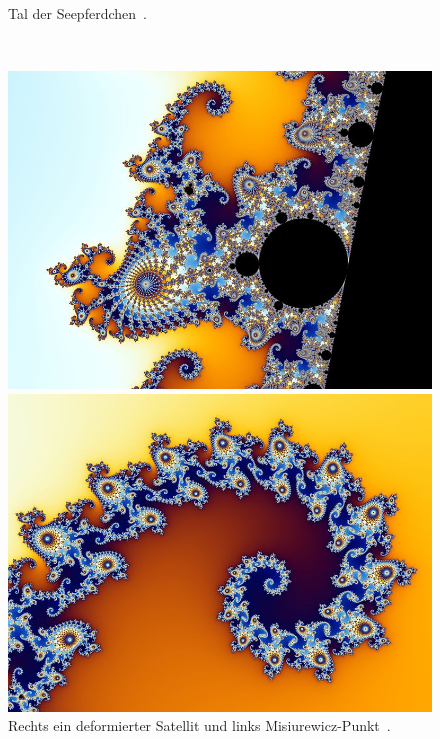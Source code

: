 \begin{figure}[H]
\begin{minipage}[t]{0.40\textwidth}
    \vspace*{-4ex}
    \caption{\grqq Tal der Seepferdchen\glqq~\cite{beyer_partial_2005-1}.}
    \label{app:6.2}
  \end{minipage}
  \\[2ex]
  \begin{minipage}[t]{0.40\textwidth}
    \centering
    \includegraphics[width=\linewidth]{images/zoom/800px-Mandel_zoom_03_seehorse}
    \vspace*{-4ex}
    \caption{Rechts ein deformierter Satellit und links Misiurewicz-Punkt~\cite{beyer_partial_2005-2}.}
    \label{app:6.3}
  \end{minipage}%
  \hspace{8ex}
  \begin{minipage}[t]{0.40\textwidth}
    \centering
    \includegraphics[width=\linewidth]{images/zoom/800px-Mandel_zoom_04_seehorse_tail}

\end{minipage}
\end{figure}
